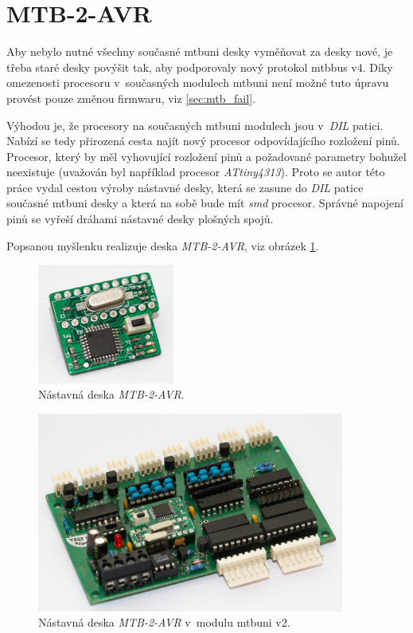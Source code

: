 \newpage
\section{MTB-2-AVR} \label{sec:mtb-2-avr}

Aby nebylo nutné všechny současné \gls{mtbuni} desky vyměňovat za desky nové,
je třeba staré desky povýšit tak, aby podporovaly nový protokol \gls{mtbbus} v4.
Díky omezenosti procesoru v~současných modulech \gls{mtbuni} není možné tuto
úpravu provést pouze změnou firmwaru, viz \ref{sec:mtb_fail}.

Výhodou je, že procesory na současných \gls{mtbuni} modulech jsou
v~\textit{DIL} patici. Nabízí se tedy přirozená cesta najít nový procesor
odpovídajícího rozložení pinů. Procesor, který by měl vyhovující rozložení pinů
a požadované parametry bohužel neexistuje (uvažován byl například procesor
\textit{ATtiny4313}). Proto se autor této práce vydal cestou výroby nástavné
desky, která se zasune do \textit{DIL} patice současné \gls{mtbuni} desky a
která na sobě bude mít \textit{smd} procesor. Správné napojení pinů se vyřeší
dráhami nástavné desky plošných spojů.

Popsanou myšlenku realizuje deska \textit{MTB-2-AVR}, viz obrázek
\ref{fig:mtb-2-avr-alone}.

\begin{figure}[ht]
\includegraphics[width=0.4\textwidth]{data/uni-2-upgrade-alone.jpg}
\caption{Nástavná deska \textit{MTB-2-AVR}.}
\label{fig:mtb-2-avr-alone}
\end{figure}

\begin{figure}[ht]
\includegraphics[width=0.9\textwidth]{data/uni-2-upgrade-all.jpg}
\caption{Nástavná deska \textit{MTB-2-AVR} v~modulu \gls{mtbuni} v2.}
\label{fig:mtb-2-avr-inside}
\end{figure}

